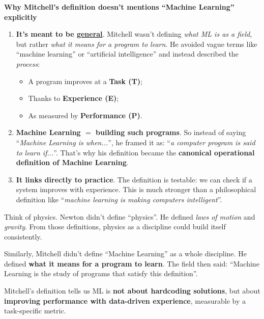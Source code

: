 \highspace
\begin{flushleft}
    \textcolor{Green3}{ \textbf{Why Mitchell's definition doesn't mentions ``Machine Learning'' explicitly}}
\end{flushleft}
\begin{enumerate}
    \item \textbf{It's meant to be \underline{general}}. Mitchell wasn't defining \emph{what ML is as a field}, but rather \emph{what it means for a program to learn}. He avoided vague terms like ``machine learning'' or ``artificial intelligence'' and instead described the \emph{process}:
    \begin{itemize}
        \item A program improves at a \textbf{Task (T)};
        \item Thanks to \textbf{Experience (E)};
        \item As measured by \textbf{Performance (P)}.
    \end{itemize}

    \item \textbf{Machine Learning $=$ building such programs}. So instead of saying ``\emph{Machine Learning is when...}'', he framed it as: ``\emph{a computer program is said to learn if...}''. That's why his definition became the \textbf{canonical operational definition of Machine Learning}.
    
    \item \textbf{It links directly to practice}. The definition is testable: we can check if a system improves with experience. This is much stronger than a philosophical definition like ``\emph{machine learning is making computers intelligent}''.
\end{enumerate}

\begin{examplebox}[: Analogy]
    Think of physics. Newton didn't define ``physics''. He defined \emph{laws of motion} and \emph{gravity}. From those definitions, physics as a discipline could build itself consistently.

    Similarly, Mitchell didn't define ``Machine Learning'' as a whole discipline. He defined \textbf{what it means for a program to learn}. The field then said: ``Machine Learning is the study of programs that satisfy this definition''.
\end{examplebox}

\noindent
Mitchell's definition tells us ML is \textbf{not about hardcoding solutions}, but about \textbf{improving performance with data-driven experience}, measurable by a task-specific metric.

